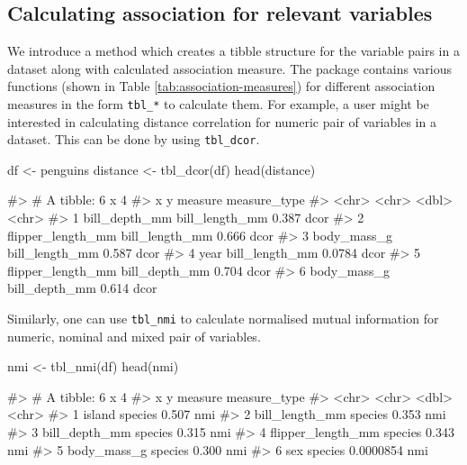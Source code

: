 \hypertarget{calculating-association-for-relevant-variables}{%
\subsection{Calculating association for relevant
variables}\label{calculating-association-for-relevant-variables}}

We introduce a method which creates a tibble structure for the variable
pairs in a dataset along with calculated association measure. The
package contains various functions (shown in Table
\ref{tab:association-measures}) for different association measures in
the form \texttt{tbl\_*} to calculate them. For example, a user might be
interested in calculating distance correlation for numeric pair of
variables in a dataset. This can be done by using \texttt{tbl\_dcor}.

\begin{Schunk}
\begin{Sinput}
df <- penguins
distance <- tbl_dcor(df)
head(distance)
\end{Sinput}
\begin{Soutput}
#> # A tibble: 6 x 4
#>   x                 y              measure measure_type
#>   <chr>             <chr>            <dbl> <chr>       
#> 1 bill_depth_mm     bill_length_mm  0.387  dcor        
#> 2 flipper_length_mm bill_length_mm  0.666  dcor        
#> 3 body_mass_g       bill_length_mm  0.587  dcor        
#> 4 year              bill_length_mm  0.0784 dcor        
#> 5 flipper_length_mm bill_depth_mm   0.704  dcor        
#> 6 body_mass_g       bill_depth_mm   0.614  dcor
\end{Soutput}
\end{Schunk}

Similarly, one can use \texttt{tbl\_nmi} to calculate normalised mutual
information for numeric, nominal and mixed pair of variables.

\begin{Schunk}
\begin{Sinput}
nmi <- tbl_nmi(df)
head(nmi)
\end{Sinput}
\begin{Soutput}
#> # A tibble: 6 x 4
#>   x                 y         measure measure_type
#>   <chr>             <chr>       <dbl> <chr>       
#> 1 island            species 0.507     nmi         
#> 2 bill_length_mm    species 0.353     nmi         
#> 3 bill_depth_mm     species 0.315     nmi         
#> 4 flipper_length_mm species 0.343     nmi         
#> 5 body_mass_g       species 0.300     nmi         
#> 6 sex               species 0.0000854 nmi
\end{Soutput}
\end{Schunk}

